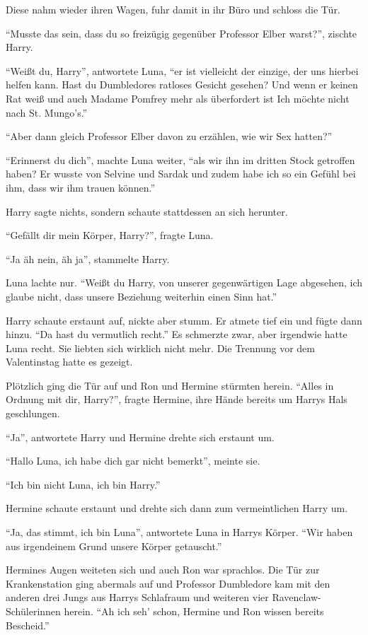 Diese nahm wieder ihren Wagen, fuhr damit in ihr Büro und schloss die Tür.

\enquote{Musste das sein, dass du so freizügig gegenüber Professor Elber warst?}, zischte Harry.

\enquote{Weißt du, Harry}, antwortete Luna, \enquote{er ist vielleicht der einzige, der uns hierbei helfen kann. Hast du Dumbledores ratloses Gesicht gesehen? Und wenn er keinen Rat weiß und auch Madame Pomfrey mehr als überfordert ist \gst Ich möchte nicht nach St. Mungo's.}

\enquote{Aber dann gleich Professor Elber davon zu erzählen, wie wir Sex hatten?}

\enquote{Erinnerst du dich}, machte Luna weiter, \enquote{als wir ihn im dritten Stock getroffen haben? Er wusste von Selvine und Sardak und zudem habe ich so ein Gefühl bei ihm, dass wir ihm trauen können.}

Harry sagte nichts, sondern schaute stattdessen an sich herunter.

\enquote{Gefällt dir mein Körper, Harry?}, fragte Luna.

\enquote{Ja \gst äh nein, \gst äh \gst ja}, stammelte Harry.

Luna lachte nur. \enquote{Weißt du Harry, von unserer gegenwärtigen Lage abgesehen, ich glaube nicht, dass unsere Beziehung weiterhin einen Sinn hat.}

Harry schaute erstaunt auf, nickte aber stumm. Er atmete tief ein und fügte dann hinzu. \enquote{Da hast du vermutlich recht.} Es schmerzte zwar, aber irgendwie hatte Luna recht. Sie liebten sich wirklich nicht mehr. Die Trennung vor dem Valentinstag hatte es gezeigt.

Plötzlich ging die Tür auf und Ron und Hermine stürmten herein. \enquote{Alles in Ordnung mit dir, Harry?}, fragte Hermine, ihre Hände bereits um Harrys Hals geschlungen.

\enquote{Ja}, antwortete Harry und Hermine drehte sich erstaunt um.

\enquote{Hallo Luna, ich habe dich gar nicht bemerkt}, meinte sie.

\enquote{Ich bin nicht Luna, ich bin Harry.}

Hermine schaute erstaunt und drehte sich dann zum vermeintlichen Harry um.

\enquote{Ja, das stimmt, ich bin Luna}, antwortete Luna in Harrys Körper. \enquote{Wir haben aus irgendeinem Grund unsere Körper getauscht.}

Hermines Augen weiteten sich und auch Ron war sprachlos. Die Tür zur Krankenstation ging abermals auf und Professor Dumbledore kam mit den anderen drei Jungs aus Harrys Schlafraum und weiteren vier Ravenclaw-Schülerinnen herein. \enquote{Ah ich seh' schon, Hermine und Ron wissen bereits Bescheid.}

